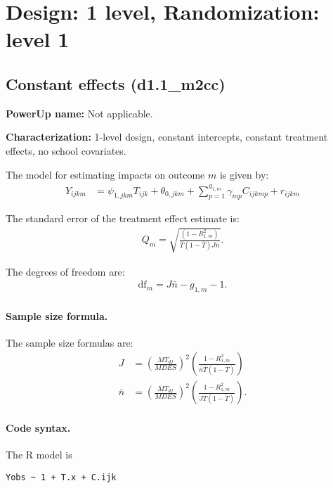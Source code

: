 \documentclass[12pt]{article}
\begin{document}

\newpage
\section{Design: 1 level, Randomization: level 1}

\subsection{Constant effects (d1.1\_m2cc)}

\textbf{PowerUp name:} Not applicable.

\textbf{Characterization:} 1-level design, constant intercepts, constant treatment effects, no school covariates.

The model for estimating impacts on outcome $m$ is given by:
\begin{align}
Y_{ijkm} &= \psi_{1,jkm} T_{ijk} + \theta_{0,jkm} + \sum_{p=1}^{g_{1,m}} \gamma_{mp} C_{ijkmp} + r_{ijkm}
\end{align}

The standard error of the treatment effect estimate is:
\begin{align} Q_m = \sqrt{\frac{(1-R^2_{1,m})}{\bar{T}(1 - \bar{T}) J \bar{n}}} . \end{align}

The degrees of freedom are:
\begin{align}\text{df}_m = J \bar{n} - g_{1,m} - 1.\end{align}

\paragraph{Sample size formula.} 
The sample size formulas are:
\begin{align}
J &= \left(\frac{MT_{df}}{MDES}\right)^2 \left(\frac{1-R^2_{1,m}}{\bar{n} \bar{T} (1 - \bar{T})} \right)\\
\bar{n} &= \left(\frac{MT_{df}}{MDES}\right)^2 \left(\frac{1-R^2_{1,m}}{J \bar{T} (1 - \bar{T})} \right) .
\end{align}

\paragraph{Code syntax.}
The R model is
\begin{verbatim}
Yobs ~ 1 + T.x + C.ijk
\end{verbatim}
\end{document}
